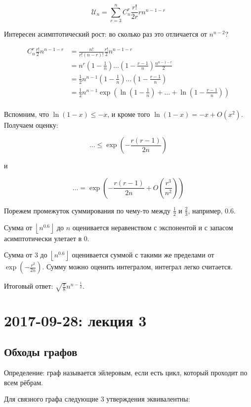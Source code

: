 \documentclass[12pt]{article}
\begin{document}
\[
\mathcal{U}_n = \sum_{r = 3}^n C^r_n \frac {r!} {2 r} r n^{n - 1 - r}
\]

Интересен асимптотический рост: во сколько раз это отличается от $n^{n - 2}$?

\begin{align*}
C^r_n \frac {r!} 2 n^{n - 1 - r} &= \frac {n!} {r!(n-r)!} \frac {r!} 2 n^{n-1-r} \\
&= n^r \left(1 - \frac 1 n \right) \ldots \left(1 - \frac {r - 1} n \right) \frac {n^{n - 1 - r}} 2 \\
&= \frac 1 2 n^{n - 1} \left(1 - \frac 1 n\right) \ldots \left(1 - \frac {r - 1} n\right) \\
&= \frac 1 2 n^{n - 1} \exp\left(\ln\left(1 - \frac 1 n\right) + \ldots + \ln\left(1 - \frac {r - 1} n\right)\right) \\
\end{align*}

Вспомним, что $\ln(1 - x) \leq -x$, и кроме того $\ln(1 - x) = -x + O(x^2)$. Получаем оценку:

\[
\ldots \leq \exp \left( -\frac {r(r-1)} {2n} \right)
\]

и

\[
\ldots = \exp \left( -\frac {r(r-1)} {2n} + O \left(\frac {r^3} {n^2} \right) \right)
\]

Порежем промежуток суммирования по чему-то между $\frac 1 2$ и $\frac 2 3$, например, $0.6$.

Сумма от $\left\lfloor n^{0.6} \right\rfloor$ до $n$ оценивается неравенством с экспонентой и с запасом асимптотически улетает в 0.

Сумма от $3$ до $\left\lfloor n^{0.6} \right\rfloor$ оценивается суммой с такими же пределами от $\exp \left( -\frac {r^2} {2n} \right)$. Сумму можно оценить интегралом, интеграл легко считается.

Итоговый ответ: $\sqrt{\frac \pi 8} n^{n - \frac 1 2}$.

\section{2017-09-28: лекция 3}

\subsection{Обходы графов}

Определение: граф называется эйлеровым, если есть цикл, который проходит по всем рёбрам.

Для связного графа следующие 3 утверждения эквивалентны:
\end{document}
